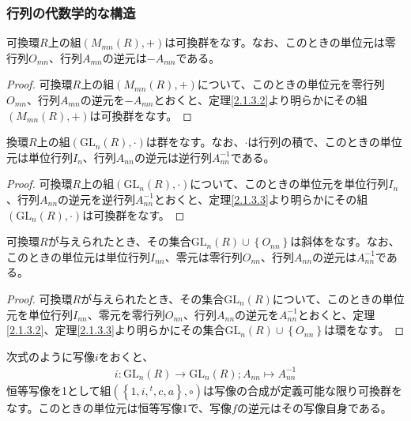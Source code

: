 \documentclass[dvipdfmx]{jsarticle}
\begin{document}
\subsubsection{行列の代数学的な構造}%
\begin{thm}\label{2.1.3.11}
可換環$R$上の組$\left( M_{mn}(R), + \right)$は可換群をなす。なお、このときの単位元は零行列$O_{mn}$、行列$A_{mn}$の逆元は$- A_{mn}$である。
\end{thm}
\begin{proof}
可換環$R$上の組$\left( M_{mn}(R), + \right)$について、このときの単位元を零行列$O_{mn}$、行列$A_{mn}$の逆元を$- A_{mn}$とおくと、定理\ref{2.1.3.2}より明らかにその組$\left( M_{mn}(R), + \right)$は可換群をなす。
\end{proof}
\begin{thm}\label{2.1.3.12}
換環$R$上の組$\left( {\mathrm{GL}}_{n}(R), \cdot \right)$は群をなす。なお、$\cdot$は行列の積で、このときの単位元は単位行列$I_{n}$、行列$A_{nn}$の逆元は逆行列$A_{nn}^{- 1}$である。
\end{thm}
\begin{proof}
可換環$R$上の組$\left( {\mathrm{GL}}_{n}(R), \cdot \right)$について、このときの単位元を単位行列$I_{n}$、行列$A_{nn}$の逆元を逆行列$A_{nn}^{- 1}$とおくと、定理\ref{2.1.3.3}より明らかにその組$\left( {\mathrm{GL}}_{n}(R), \cdot \right)$は可換群をなす。
\end{proof}
\begin{thm}\label{2.1.3.13}
可換環$R$が与えられたとき、その集合${\mathrm{GL}}_{n}(R) \cup \left\{ O_{nn} \right\}$は斜体をなす。なお、このときの単位元は単位行列$I_{nn}$、零元は零行列$O_{nn}$、行列$A_{nn}$の逆元は$A_{nn}^{- 1}$である。
\end{thm}
\begin{proof}
可換環$R$が与えられたとき、その集合${\mathrm{GL}}_{n}(R)$について、このときの単位元を単位行列$I_{nn}$、零元を零行列$O_{nn}$、行列$A_{nn}$の逆元を$A_{nn}^{- 1}$とおくと、定理\ref{2.1.3.2}、定理\ref{2.1.3.3}より明らかにその集合${\mathrm{GL}}_{n}(R) \cup \left\{ O_{nn} \right\}$は環をなす。
\end{proof}
\begin{thm}\label{2.1.3.14}
次式のように写像$i$をおくと、
\begin{align*}
i:{\mathrm{GL}}_{n}(R) \rightarrow {\mathrm{GL}}_{n}(R);A_{nn} \mapsto A_{nn}^{- 1}
\end{align*}
恒等写像を1として組$\left( \left\{ 1,i,{}^{t},c,a \right\}, \circ \right)$は写像の合成が定義可能な限り可換群をなす。このときの単位元は恒等写像$1$で、写像$f$の逆元はその写像自身である。
\end{thm}
\end{document}

